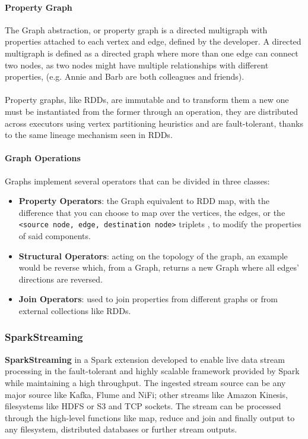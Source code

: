 \paragraph{Property Graph}

The Graph abstraction, or property graph is a directed multigraph with properties attached to each vertex and edge, defined by the developer. A directed multigraph is defined as a directed graph where more than one edge can connect two nodes, as two nodes might have multiple relationships with different properties, (e.g. Annie and Barb are both colleagues and friends). \\ \\
Property graphs, like RDDs, are immutable and to transform them a new one must be instantiated from the former through an operation, they are distributed across executors using vertex partitioning heuristics and are fault-tolerant, thanks to the same lineage mechanism seen in RDDs.

\paragraph{Graph Operations}

Graphs implement several operators that can be divided in three classes:

\begin{itemize}
	\item \textbf{Property Operators}: the Graph equivalent to RDD map, with the difference that you can choose to map over the vertices, the edges, or the \texttt{<source node, edge, destination node>} triplets , to modify the properties of said components.
	\item \textbf{Structural Operators}: acting on the topology of the graph, an example would be reverse which, from a Graph, returns a new Graph where all edges' directions are reversed.
	\item \textbf{Join Operators}: used to join properties from different graphs or from external collections like RDDs.
\end{itemize}


\subsubsection{SparkStreaming}

\textbf{SparkStreaming} in a Spark extension developed to enable live data stream processing in the fault-tolerant and highly scalable framework provided by Spark while maintaining a high throughput.
The ingested stream source can be any major source like Kafka, Flume and NiFi; other streams like Amazon Kinesis, filesystems like HDFS or S3 and TCP sockets.
The stream can be processed through the high-level functions like map, reduce and join and finally output to any filesystem, distributed databases or further stream outputs.

